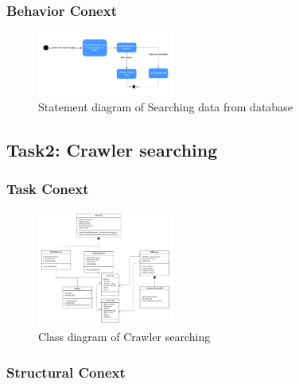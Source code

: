 \documentclass[conference]{IEEEtran}
\begin{document}
\subsubsection{\textbf{Behavior Conext }}

\begin{figure}[htbp]
	\centerline{\includegraphics[width=0.4\textwidth]{image/searching hotel statement1.pdf}}
	\caption{Statement diagram of Searching data from database }
	\label{statement1}
\end{figure}

\subsection{\textbf{Task2: Crawler searching }}


\subsubsection{\textbf{Task Conext }}

\begin{figure}[htbp]
	\centerline{\includegraphics[width=0.4\textwidth]{image/crawler search class1.pdf}}
	\caption{Class diagram of Crawler searching }
	\label{class1}
\end{figure}

\subsubsection{\textbf{Structural Conext }}
\end{document}
